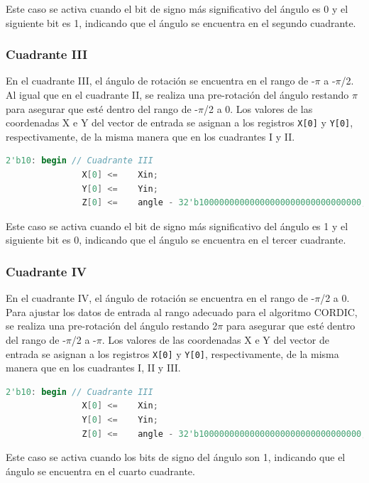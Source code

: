 \documentclass[12pt,a4paper, twoside]{article} %
\begin{document}
Este caso se activa cuando el bit de signo más significativo del ángulo es 0 y el siguiente bit es 1, indicando que el ángulo se encuentra en el segundo cuadrante.

\subsubsection{Cuadrante III}

En el cuadrante III, el ángulo de rotación se encuentra en el rango de -$\pi$ a -$\pi$/2. Al igual que en el cuadrante II, se realiza una pre-rotación del ángulo restando $\pi$ para asegurar que esté dentro del rango de -$\pi$/2 a 0. Los valores de las coordenadas X e Y del vector de entrada se asignan a los registros \texttt{X[0]} y \texttt{Y[0]}, respectivamente, de la misma manera que en los cuadrantes I y II.

\begin{lstlisting}[language=Verilog]
       2'b10: begin // Cuadrante III
               X[0] <=    Xin;
               Y[0] <=    Yin;
               Z[0] <=    angle - 32'b10000000000000000000000000000000; 
\end{lstlisting}

Este caso se activa cuando el bit de signo más significativo del ángulo es 1 y el siguiente bit es 0, indicando que el ángulo se encuentra en el tercer cuadrante.

\subsubsection{Cuadrante IV}

En el cuadrante IV, el ángulo de rotación se encuentra en el rango de -$\pi$/2 a 0. Para ajustar los datos de entrada al rango adecuado para el algoritmo CORDIC, se realiza una pre-rotación del ángulo restando 2$\pi$ para asegurar que esté dentro del rango de -$\pi$/2 a -$\pi$. Los valores de las coordenadas X e Y del vector de entrada se asignan a los registros \texttt{X[0]} y \texttt{Y[0]}, respectivamente, de la misma manera que en los cuadrantes I, II y III.


\begin{lstlisting}[language=Verilog]
       2'b10: begin // Cuadrante III
               X[0] <=    Xin;
               Y[0] <=    Yin;
               Z[0] <=    angle - 32'b10000000000000000000000000000000; 
\end{lstlisting}

Este caso se activa cuando los bits de signo del ángulo son 1, indicando que el ángulo se encuentra en el cuarto cuadrante.
\end{document}
